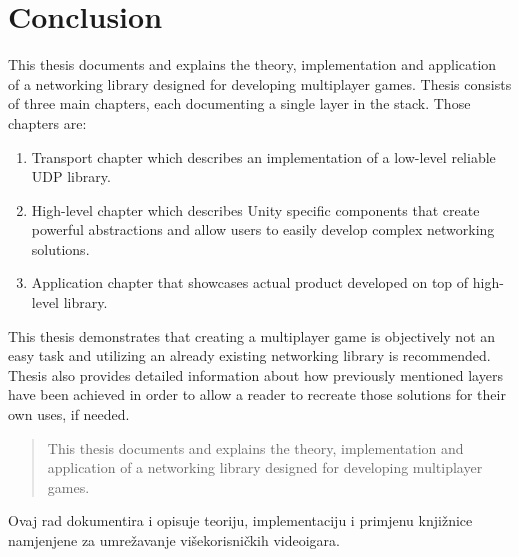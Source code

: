\documentclass[times, utf8, diplomski]{fer}
\begin{document}
\chapter{Conclusion}
This thesis documents and explains the theory, implementation and application of a networking library designed for developing multiplayer games. Thesis consists of three main chapters, each documenting a single layer in the stack. Those chapters are:

\begin{enumerate}
	\item Transport chapter which describes an implementation of a low-level reliable UDP library.
	\item High-level chapter which describes Unity specific components that create powerful abstractions and allow users to easily develop complex networking solutions.
	\item Application chapter that showcases actual product developed on top of high-level library. 
\end{enumerate}

This thesis demonstrates that creating a multiplayer game is objectively not an easy task and utilizing an already existing networking library is recommended. Thesis also provides detailed information about how previously mentioned layers have been achieved in order to allow a reader to recreate those solutions for their own uses, if needed.



\clearpage

\begin{abstract}
This thesis documents and explains the theory, implementation and application of a networking library designed for developing multiplayer games.
	
\end{abstract}



\begin{sazetak}
Ovaj rad dokumentira i opisuje teoriju, implementaciju i primjenu knjižnice namjenjene za umrežavanje višekorisničkih videoigara.

\end{sazetak}
\end{document}
